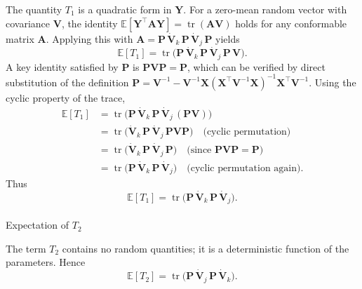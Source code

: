 \documentclass[
  letterpaper,
  DIV=11,
  numbers=noendperiod]{scrartcl}
\makeatletter
\let\oldparagraph\paragraph
\renewcommand{\paragraph}{
    \@ifstar
      \xxxParagraphStar
      \xxxParagraphNoStar
  }
\newcommand{\xxxParagraphStar}[1]{\oldparagraph*{#1}\mbox{}}
\newcommand{\xxxParagraphNoStar}[1]{\oldparagraph{#1}\mbox{}}
\makeatother
\begin{document}
The quantity \(T_1\) is a quadratic form in \(\symbf{Y}\). For a
zero-mean random vector with covariance \(\symbf{V}\), the identity
\(\mathbb{E}[\symbf{Y}^\top \symbf{A} \symbf{Y}] = \operatorname{tr}(\symbf{A} \symbf{V})\)
holds for any conformable matrix \(\symbf{A}\). Applying this with
\(\symbf{A} = \symbf{P}\,\dot{\symbf{V}}_k\,\symbf{P}\,\dot{\symbf{V}}_j\,\symbf{P}\)
yields \begin{equation}
\mathbb{E}[T_1] = \operatorname{tr}\!\big( \symbf{P}\,\dot{\symbf{V}}_k\,\symbf{P}\,\dot{\symbf{V}}_j\,\symbf{P} \, \symbf{V} \big).
\end{equation} A key identity satisfied by \(\symbf{P}\) is
\(\symbf{P}\symbf{V}\symbf{P} = \symbf{P}\), which can be verified by
direct substitution of the definition
\(\symbf{P} = \symbf{V}^{-1} - \symbf{V}^{-1}\symbf{X}(\symbf{X}^\top\symbf{V}^{-1}\symbf{X})^{-1}\symbf{X}^\top\symbf{V}^{-1}\).
Using the cyclic property of the trace, \begin{align}
\mathbb{E}[T_1] &= \operatorname{tr}\!\big( \symbf{P}\,\dot{\symbf{V}}_k\,\symbf{P}\,\dot{\symbf{V}}_j\, (\symbf{P}\symbf{V}) \big) \\
&= \operatorname{tr}\!\big( \dot{\symbf{V}}_k\,\symbf{P}\,\dot{\symbf{V}}_j\,\symbf{P}\symbf{V}\symbf{P} \big) \quad \text{(cyclic permutation)} \\
&= \operatorname{tr}\!\big( \dot{\symbf{V}}_k\,\symbf{P}\,\dot{\symbf{V}}_j\,\symbf{P} \big) \quad \text{(since $\symbf{P}\symbf{V}\symbf{P} = \symbf{P}$)} \\
&= \operatorname{tr}\!\big( \symbf{P}\,\dot{\symbf{V}}_k\,\symbf{P}\,\dot{\symbf{V}}_j \big) \quad \text{(cyclic permutation again)}.
\end{align} Thus \begin{equation}
\mathbb{E}[T_1] = \operatorname{tr}\!\big( \symbf{P}\,\dot{\symbf{V}}_k\,\symbf{P}\,\dot{\symbf{V}}_j \big).
\end{equation}

\paragraph{\texorpdfstring{Expectation of
\(T_2\)}{Expectation of T\_2}}\label{expectation-of-t_2}

The term \(T_2\) contains no random quantities; it is a deterministic
function of the parameters. Hence \begin{equation}
\mathbb{E}[T_2] = \operatorname{tr}\!\big( \symbf{P}\,\dot{\symbf{V}}_j\,\symbf{P}\,\dot{\symbf{V}}_k \big).
\end{equation}
\end{document}
